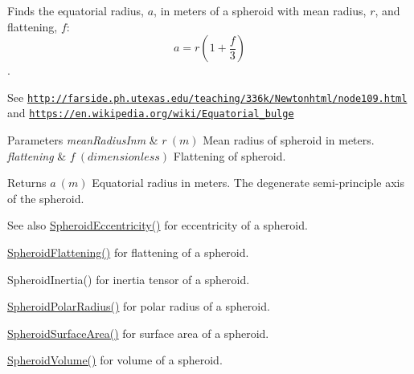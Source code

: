Finds the equatorial radius, $a$, in meters of a spheroid with mean radius, $r$, and flattening, $f$\+: \[ a = r \left (1 + \dfrac{f}{3} \right ) \]. 

See \href{http://farside.ph.utexas.edu/teaching/336k/Newtonhtml/node109.html}{\tt http\+://farside.\+ph.\+utexas.\+edu/teaching/336k/\+Newtonhtml/node109.\+html} and \href{https://en.wikipedia.org/wiki/Equatorial_bulge}{\tt https\+://en.\+wikipedia.\+org/wiki/\+Equatorial\+\_\+bulge} 
\begin{DoxyParams}{Parameters}
{\em mean\+Radius\+Inm} & $ r\ (m)$ Mean radius of spheroid in meters. \\
\hline
{\em flattening} & $ f\ (dimensionless)$ Flattening of spheroid. \\
\hline
\end{DoxyParams}
\begin{DoxyReturn}{Returns}
$ a\ (m)$ Equatorial radius in meters. The degenerate semi-\/principle axis of the spheroid. 
\end{DoxyReturn}
\begin{DoxySeeAlso}{See also}
\mbox{\hyperlink{group___e_g_x_math-_geometry-3_d-_spheroid-_eccentricity_gab45680528a41bb7a5e15ddc0059156dd}{Spheroid\+Eccentricity()}} for eccentricity of a spheroid. 

\mbox{\hyperlink{group___e_g_x_math-_geometry-3_d-_spheroid-_flattening_ga05e3be91f5f7fbaa9371687aa3834179}{Spheroid\+Flattening()}} for flattening of a spheroid. 

Spheroid\+Inertia() for inertia tensor of a spheroid. 

\mbox{\hyperlink{group___e_g_x_math-_geometry-3_d-_spheroid-_polar_radius_gad4791a46a7efe39c63c03d2366fdd3d2}{Spheroid\+Polar\+Radius()}} for polar radius of a spheroid. 

\mbox{\hyperlink{group___e_g_x_math-_geometry-3_d-_spheroid-_surface_area_ga5a3580e7ded82cb678a558905f41ae49}{Spheroid\+Surface\+Area()}} for surface area of a spheroid. 

\mbox{\hyperlink{group___e_g_x_math-_geometry-3_d-_spheroid-_volume_ga12125484235e94b8f2580f3476b05b92}{Spheroid\+Volume()}} for volume of a spheroid. 
\end{DoxySeeAlso}
